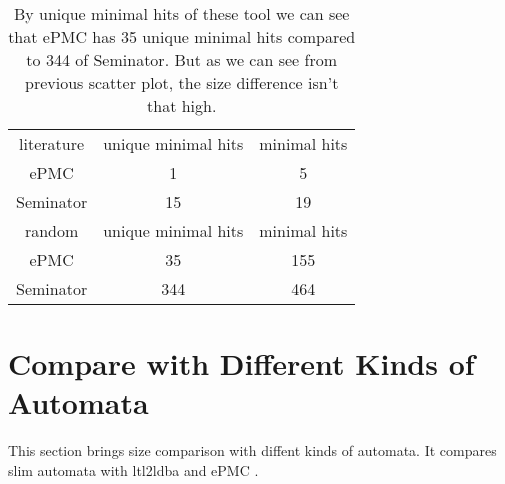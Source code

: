 \documentclass[
	digital,
nolof, nolot
]{fithesis3}
\begin{document}
\begin{table}[ht]
	\centering
	\label{table:epmc-seminator-min-hits}
	\caption{By unique minimal hits of these tool we can see that ePMC has 35 unique minimal hits compared to 344 of Seminator. But as we can see from previous scatter plot, the size difference isn't that high.}
	\begin{tabular}{ |c||c|c| } 
		\hline
		literature&unique minimal hits&minimal hits\\
		\hhline{|===|}
		ePMC&1 & 5\\
		\hline
		Seminator &15 & 19\\ 
		\hline
		\hline
		random&unique minimal hits&minimal hits\\
		\hhline{|===|}
		ePMC&35 & 155\\
		\hline
		Seminator &344 & 464\\ 
		\hline
	\end{tabular}
\end{table}
		
	
	
	
		
		

	\clearpage
		\section{Compare with Different Kinds of Automata}
		This section brings size comparison with diffent kinds of automata. It compares slim automata with ltl2ldba \cite{ltl2ldba} and ePMC \cite{epmc}.
		
\end{document}
